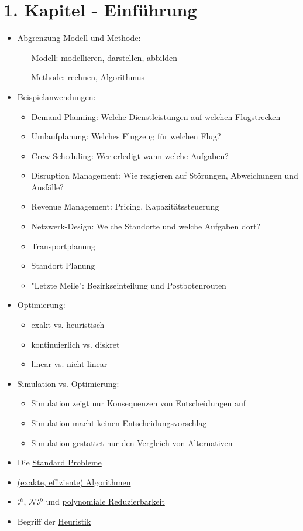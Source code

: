\documentclass[12pt]{article}
\begin{document}
	\section{1. Kapitel - Einführung}
	\begin{itemize}
		\item Abgrenzung Modell und Methode:
			\begin{itemize}
				\item[Modell:] modellieren, darstellen, abbilden
				\item[Methode:] rechnen, Algorithmus
			\end{itemize}
		\item Beispielanwendungen:
			\begin{itemize}
				\item Demand Planning: Welche Dienstleistungen auf welchen Flugstrecken
				\item Umlaufplanung: Welches Flugzeug für welchen Flug?
				\item Crew Scheduling: Wer erledigt wann welche Aufgaben?
				\item Disruption Management: Wie reagieren auf Störungen, Abweichungen und Ausfälle?
				\item Revenue Management: Pricing, Kapazitätssteuerung
				\item Netzwerk-Design: Welche Standorte und welche Aufgaben dort?
				\item Transportplanung
				\item Standort Planung
				\item "Letzte Meile": Bezirkseinteilung und Postbotenrouten
			\end{itemize}
		\item Optimierung:
			\begin{itemize}
				\item exakt vs. heuristisch
				\item kontinuierlich vs. diskret
				\item linear vs. nicht-linear 
			\end{itemize}
		\item \hyperref[Simulation]{Simulation} vs. Optimierung:
			\begin{itemize}
				\item Simulation zeigt nur Konsequenzen von Entscheidungen auf
				\item Simulation macht keinen Entscheidungsvorschlag
				\item Simulation gestattet nur den Vergleich von Alternativen
			\end{itemize}
		\item Die \hyperref[Standard Probleme]{Standard Probleme}
		\item \hyperref[Algorithmus]{(exakte, effiziente) Algorithmen}
		\item \hyperref[P]{$\mathcal{P}$}, \hyperref[NP]{$\mathcal{NP}$} und \hyperref[polyRed]{polynomiale Reduzierbarkeit}
		\item Begriff der \hyperref[Heuristik]{Heuristik}
	\end{itemize}
\end{document}
